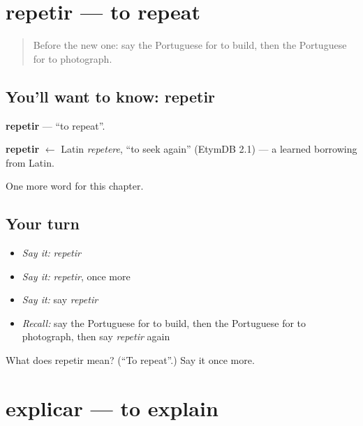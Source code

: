 \section[repetir]{repetir — to repeat}

\label{lesson:PT-C231-repetir}



\begin{quote}
Before the new one: say the Portuguese for to build, then the Portuguese for to photograph.
\end{quote}

\subsection*{You'll want to know: repetir}
\textbf{repetir} — \textquotedblleft{}to repeat\textquotedblright{}.

\begin{cousinweb}
\textbf{repetir} $\leftarrow$ Latin \emph{repetere}, \textquotedblleft{}to seek again\textquotedblright{} (EtymDB 2.1) — a learned borrowing from Latin.
\end{cousinweb}

\begin{grammarlens}[title={What you've built}]
One more word for this chapter.
\end{grammarlens}

\subsection*{Your turn}
\begin{itemize}
\raggedright
  \item \emph{Say it:} \emph{repetir}
  \item \emph{Say it:} \emph{repetir}, once more
  \item \emph{Say it:} say \emph{repetir}
  \item \emph{Recall:} say the Portuguese for to build, then the Portuguese for to photograph, then say \emph{repetir} again
\end{itemize}

\begin{tcolorbox}[breakable,colback=teal!4,colframe=teal!35!black,title={Before you move on}]
What does repetir mean? (\textquotedblleft{}To repeat\textquotedblright{}.) Say it once more.
\end{tcolorbox}
\section[explicar]{explicar — to explain}

